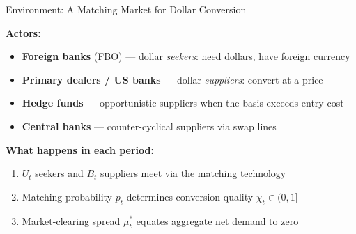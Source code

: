 \documentclass[aspectratio=169, 10pt]{beamer}
\newcommand{\mustar}{\mu_t^{*}}      %
\newcommand{\Bt}{B_t}                %
\newcommand{\Ut}{U_t}                %
\begin{document}
\begin{frame}{Environment: A Matching Market for Dollar Conversion}

  \textbf{Actors:}
  \begin{itemize}
    \item \textbf{Foreign banks} (FBO) --- dollar \emph{seekers}: need dollars, have foreign currency
    \item \textbf{Primary dealers / US banks} --- dollar \emph{suppliers}: convert at a price
    \item \textbf{Hedge funds} --- opportunistic suppliers when the basis exceeds entry cost
    \item \textbf{Central banks} --- counter-cyclical suppliers via swap lines
  \end{itemize}

  \bigskip

  \textbf{What happens in each period:}
  \begin{enumerate}
    \item $\Ut$ seekers and $\Bt$ suppliers meet via the matching technology
    \item Matching probability $p_t$ determines conversion quality $\chi_t \in (0,1]$
    \item Market-clearing spread $\mustar$ equates aggregate net demand to zero
  \end{enumerate}

\end{frame}
\end{document}
